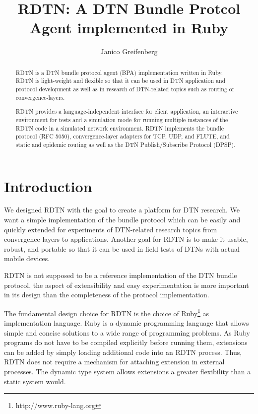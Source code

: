 \documentclass{article}
\begin{document}
\title{RDTN: A DTN Bundle Protcol Agent implemented in Ruby}

\author{Janico Greifenberg}

\maketitle

\begin{abstract}

RDTN is a DTN bundle protocol agent (BPA) implementation written in Ruby. RDTN
is light-weight and flexible so that it can be used in DTN application and
protocol development as well as in research of DTN-related topics such as
routing or convergence-layers. 

RDTN provides a language-independent interface for client application, an
interactive environment for tests and a simulation mode for running multiple
instances of the RDTN code in a simulated network environment. RDTN implements
the bundle protocol (RFC 5050), convergence-layer adapters for TCP, UDP, and
FLUTE, and static and epidemic routing as well as the DTN Publish/Subscribe
Protocol (DPSP).

\end{abstract}

\section{Introduction}\label{sec.intro}

We designed RDTN with the goal to create a platform for DTN research.  We want a
simple implementation of the bundle protocol which can be easily and quickly
extended for experiments of DTN-related research topics from convergence layers
to applications. Another goal for RDTN is to make it usable, robust, and
portable so that it can be used in field tests of DTNs with actual mobile
devices.

RDTN is not supposed to be a reference implementation of the DTN bundle
protocol, the aspect of extensibility and easy experimentation is more important
in its design than the completeness of the protocol implementation.

The fundamental design choice for RDTN is the choice of
Ruby\footnote{http://www.ruby-lang.org} as implementation language. Ruby is a
dynamic programming language that allows simple and concise solutions to a wide
range of programming problems. As Ruby programs do not have to be compiled
explicitly before running them, extensions can be added by simply loading
additional code into an RDTN process. Thus, RDTN does not require a mechanism
for attaching extension in external processes. The dynamic type system allows
extensions a greater flexibility than a static system would.
\end{document}
